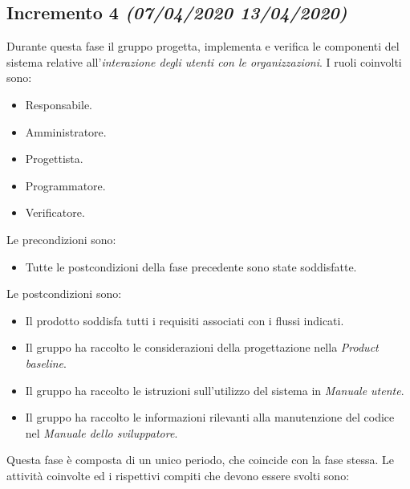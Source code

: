 \documentclass[../piano-di-progetto.tex]{subfiles}
\begin{document}
\subsection[Incremento 4]{Incremento 4 {\normalsize\normalfont\itshape(07/04/2020  13/04/2020)}}%
\label{sub:incremento_4}
Durante questa fase il gruppo progetta, implementa e verifica le componenti del sistema relative all'\textit{interazione degli utenti con le organizzazioni}.
I ruoli coinvolti sono:
\begin{itemize}
  \item Responsabile.
  \item Amministratore.
  \item Progettista.
  \item Programmatore.
  \item Verificatore.
\end{itemize}
Le precondizioni sono:
\begin{itemize}
  \item Tutte le postcondizioni della fase precedente sono state soddisfatte.
\end{itemize}
Le postcondizioni sono:
\begin{itemize}
  \item Il prodotto soddisfa tutti i requisiti associati con i flussi indicati.
  \item Il gruppo ha raccolto le considerazioni della progettazione nella \textit{Product baseline}.
  \item Il gruppo ha raccolto le istruzioni sull'utilizzo del sistema in \textit{Manuale utente}.
  \item Il gruppo ha raccolto le informazioni rilevanti alla manutenzione del codice nel \textit{Manuale dello sviluppatore}.
\end{itemize}
Questa fase è composta di un unico periodo, che coincide con la fase stessa.
Le attività coinvolte ed i rispettivi compiti che devono essere svolti sono:
\end{document}
